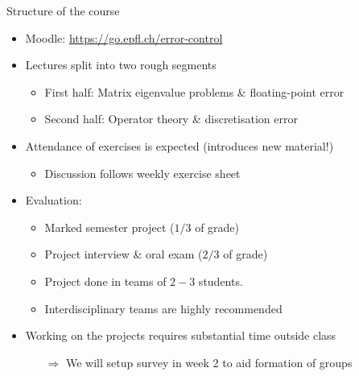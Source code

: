 \begin{frame}{Structure of the course}
    \begin{itemize}
        \item \alert{Moodle:} \url{https://go.epfl.ch/error-control}
        \vspace{0.5em}
        \item Lectures split into two rough segments
            \begin{itemize}
                \vspace{-0.3em}
                \item \alert{First half:} Matrix eigenvalue problems \& floating-point error
                \vspace{-0.3em}
                \item \alert{Second half:} Operator theory \& discretisation error
            \end{itemize}
        \vspace{0.5em}
        \item Attendance of exercises is \alert{expected} \textcolor{grey5}{(introduces new material!)}
            \begin{itemize}
                \item Discussion follows weekly exercise sheet
            \end{itemize}
        \vspace{0.5em}
        \item Evaluation:
            \begin{itemize}
                \vspace{-0.3em}
                \item Marked semester project \textcolor{grey5}{($1/3$ of grade)}
                \vspace{-0.3em}
                \item Project interview \& oral exam \textcolor{grey5}{($2/3$ of grade)}
                \vspace{-0.3em}
                \item Project done in \alert{teams of $2-3$ students}.
                \vspace{-0.3em}
                \item Interdisciplinary teams are highly recommended
            \end{itemize}
        \vspace{0.5em}
        \item Working on the projects
            \alert{requires substantial time outside class}
            \begin{itemize}
                \vspace{-0.3em}
            \item[$\Rightarrow$] We will setup \alert{survey} in week 2 to \alert{aid formation of groups}
            \end{itemize}
    \end{itemize}
\end{frame}

